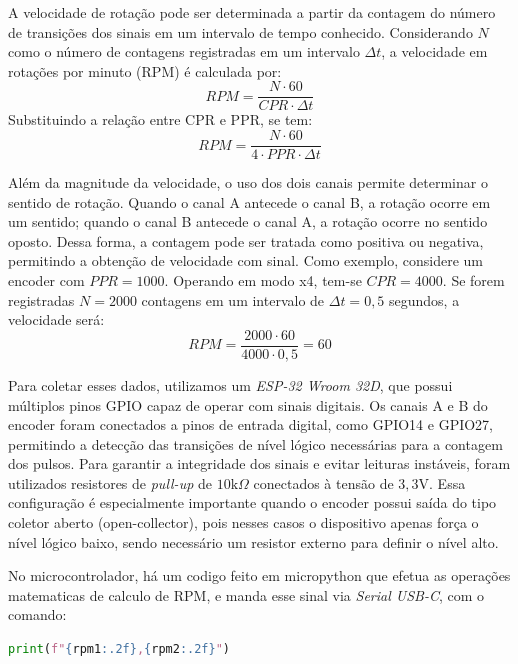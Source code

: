 \documentclass[12pt]{article}
\begin{document}
A velocidade de rotação pode ser determinada a partir da contagem do número de transições dos sinais em um intervalo de tempo conhecido. Considerando $N$ como o número de contagens registradas em um intervalo $\Delta t$, a velocidade em rotações por minuto (RPM) é calculada por:
\begin{equation}
RPM = \frac{N \cdot 60}{CPR \cdot \Delta t}
\end{equation}
Substituindo a relação entre CPR e PPR, se tem:
\begin{equation}
RPM = \frac{N \cdot 60}{4 \cdot PPR \cdot \Delta t}
\end{equation}

Além da magnitude da velocidade, o uso dos dois canais permite determinar o sentido de rotação. Quando o canal A antecede o canal B, a rotação ocorre em um sentido; quando o canal B antecede o canal A, a rotação ocorre no sentido oposto. Dessa forma, a contagem pode ser tratada como positiva ou negativa, permitindo a obtenção de velocidade com sinal.
Como exemplo, considere um encoder com $PPR = 1000$. Operando em modo x4, tem-se $CPR = 4000$. Se forem registradas $N = 2000$ contagens em um intervalo de $\Delta t = 0{,}5$ segundos, a velocidade será:
\begin{equation}
RPM = \frac{2000 \cdot 60}{4000 \cdot 0{,}5} = 60
\end{equation}

Para coletar esses dados, utilizamos um \textit{ESP-32 Wroom 32D}, que possui múltiplos pinos GPIO capaz de operar com sinais digitais. Os canais A e B do encoder foram conectados a pinos de entrada digital, como GPIO14 e GPIO27, permitindo a detecção das transições de nível lógico necessárias para a contagem dos pulsos.
Para garantir a integridade dos sinais e evitar leituras instáveis, foram utilizados resistores de \textit{pull-up} de $10\text{k}\Omega$ conectados à tensão de $3{,}3\text{V}$. Essa configuração é especialmente importante quando o encoder possui saída do tipo coletor aberto (open-collector), pois nesses casos o dispositivo apenas força o nível lógico baixo, sendo necessário um resistor externo para definir o nível alto.

No microcontrolador, há um codigo feito em micropython que efetua as operações matematicas de calculo de RPM, e manda esse sinal via \textit{Serial USB-C}, com o comando:


\begin{lstlisting}[language=Python]
print(f"{rpm1:.2f},{rpm2:.2f}")
\end{lstlisting}
\end{document}

